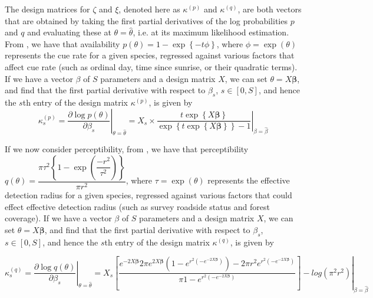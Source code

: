 \documentclass[12pt]{article}
\begin{document}
\par The design matrices for $\zeta$ and $\xi$, denoted here as $\kappa^{(p)}$ and $\kappa^{(q)}$, are both vectors that are obtained by taking the first partial derivatives of the log probabilities $p$ and $q$ and evaluating these at $\theta = \hat{\theta}$, i.e. at its maximum likelihood estimation. 
From \citet{solymos_calibrating_2013}, we have that availability $p(\theta) = 1 - \exp\left\{-t\phi\right\}$, where $\phi = \exp\left(\theta\right)$ represents the cue rate for a given species, regressed against various factors that affect cue rate (such as ordinal day, time since sunrise, or their quadratic terms). 
If we have a vector {\boldmath$\beta$} of $S$ parameters and a design matrix $X$, we can set $\theta = X\boldsymbol{\beta}$, and find that the first partial derivative with respect to $\beta_s$, $s \in \left[0, S\right]$, and hence the $s$th entry of the design matrix $\kappa^{(p)}$, is given by
\begin{equation*}\label{kappa_p}
	\kappa_{s}^{(p)} = \left.\dfrac{\partial \log p(\theta)}{\partial \beta_s}\right\vert_{\theta = \hat{\theta}} = \left. X_s \times \dfrac{t \exp\left\{X\boldsymbol{\beta}\right\}}{\exp\left\{t \exp\left\{X\boldsymbol{\beta}\right\}\right\} - 1} \right\vert_{\beta = \hat{\beta}}
\end{equation*}

\par If we now consider perceptibility, from \citet{solymos_calibrating_2013}, we have that perceptibility $q(\theta) = \dfrac{\pi \tau^2 \left\{1 - \exp\left(\dfrac{-r^2}{\tau^2}\right)\right\}}{\pi r^2}$, where $\tau = \exp(\theta)$ represents the effective detection radius for a given species, regressed against various factors that could effect effective detection radius (such as survey roadside status and forest coverage). 
If we have a vector {\boldmath$\beta$} of $S$ parameters and a design matrix $X$, we can set $\theta = X\boldsymbol{\beta}$, and find that the first partial derivative with respect to $\beta_s$, $s \in \left[0, S\right]$, and hence the $s$th entry of the design matrix $\kappa^{(q)}$, is given by

\begin{equation*}\label{kappa_q}
	\kappa_{s}^{(q)} = \left. \dfrac{\partial \log q(\theta)}{\partial \beta_s} \right\vert_{\theta = \hat{\theta}}= \left. X_s \left[\dfrac{{e^{-2X\boldsymbol{\beta}}} {2 \pi  e^{2X\boldsymbol{\beta}}} {\left(1 - e^{r^2 \left(-e^{-2X\boldsymbol{\beta}}\right)}\right)} - {2\pi r^2} {e^{r^2 \left(-e^{-2X\boldsymbol{\beta}}\right)}}}             {\pi {1-e^{r^2 \left(-e^{-2X\boldsymbol{\beta}}\right)}}}\right]  - log(\pi^2r^2) \right\vert_{\beta = \hat{\beta}}
\end{equation*}
\end{document}
